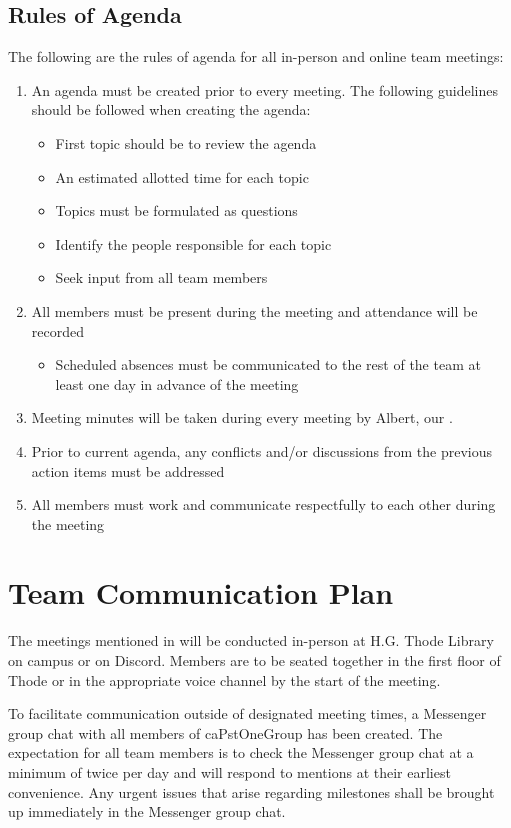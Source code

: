 \documentclass[12pt,letterpaper]{article}
\begin{document}
\subsection{Rules of Agenda}
The following are the rules of agenda for all in-person and online team
meetings:
\begin{enumerate}
    \item An agenda must be created prior to every meeting. The following
    guidelines should be followed when creating the agenda:
    \begin{itemize}
        \item First topic should be to review the agenda
        \item An estimated allotted time for each topic
        \item Topics must be formulated as questions
        \item Identify the people responsible for each topic
        \item Seek input from all team members
    \end{itemize}
    \item All members must be present during the meeting and attendance will be
    recorded
    \begin{itemize}
        \item Scheduled absences must be communicated to the rest of the team at
        least one day in advance of the meeting
    \end{itemize}
    \item Meeting minutes will be taken during every meeting by Albert, our
    .
    \item Prior to current agenda, any conflicts and/or discussions from the
    previous action items must be addressed 
    \item All members must work and communicate respectfully to each other
    during the meeting
\end{enumerate}

\section{Team Communication Plan}
The meetings mentioned in  will be conducted in-person
at H.G. Thode Library on campus or on Discord. Members are to be seated together
in the first floor of Thode or in the appropriate voice channel by the start of
the meeting. 

To facilitate communication outside of designated meeting times, a Messenger
group chat with all members of caPstOneGroup has been created. The expectation
for all team members is to check the Messenger group chat at a minimum of twice
per day and will respond to mentions at their earliest convenience. Any urgent
issues that arise regarding milestones shall be brought up immediately in the
Messenger group chat. 
\end{document}
